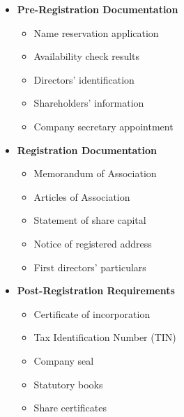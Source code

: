 \begin{tcolorbox}[
    colback=white,
    colframe=primarydark,
    title=\textbf{Corporate Affairs Commission (CAC) Requirements},
    before skip=1em,
    after skip=1em
]
    \begin{itemize}[leftmargin=*,itemsep=0.5em]
        \item \textbf{Pre-Registration Documentation}
        \begin{itemize}[itemsep=0.3em]
            \item Name reservation application
            \item Availability check results
            \item Directors' identification
            \item Shareholders' information
            \item Company secretary appointment
        \end{itemize}

        \vspace{0.5em}

        \item \textbf{Registration Documentation}
        \begin{itemize}[itemsep=0.3em]
            \item Memorandum of Association
            \item Articles of Association
            \item Statement of share capital
            \item Notice of registered address
            \item First directors' particulars
        \end{itemize}

        \vspace{0.5em}

        \item \textbf{Post-Registration Requirements}
        \begin{itemize}[itemsep=0.3em]
            \item Certificate of incorporation
            \item Tax Identification Number (TIN)
            \item Company seal
            \item Statutory books
            \item Share certificates
        \end{itemize}

        \vspace{0.5em}


\end{itemize}
\end{tcolorbox}
